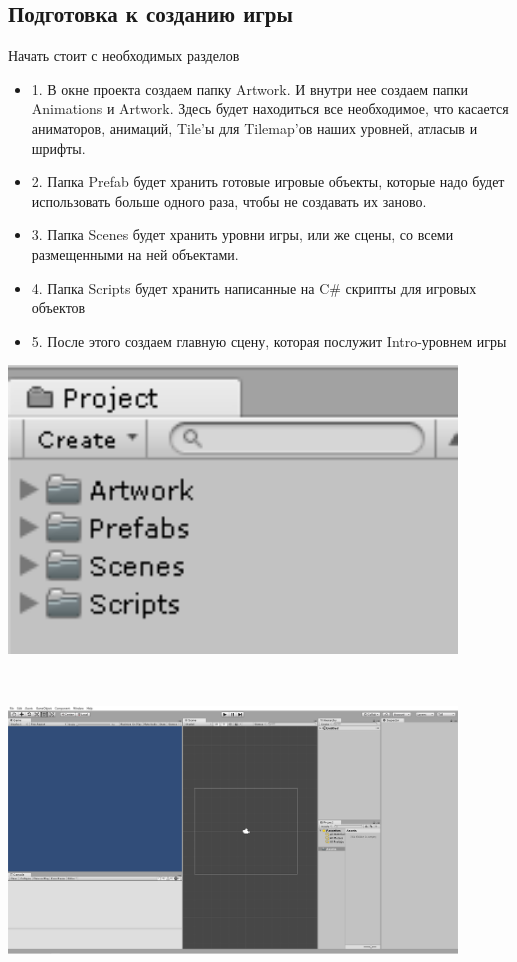 \documentclass[a4paper,12pt]{article}
\begin{document}
\newpage
\subsection{Подготовка к созданию игры}
Начать стоит с необходимых разделов \\
\begin{itemize}
    \item 1. В окне проекта создаем папку Artwork. И внутри нее создаем папки Animations и Artwork. Здесь будет находиться все необходимое, что касается аниматоров, анимаций, Tile'ы для Tilemap'ов наших уровней, атласыв и шрифты.
    \item 2. Папка Prefab будет хранить готовые игровые объекты, которые надо будет использовать больше одного раза, чтобы не создавать их заново.
    \item 3. Папка Scenes будет хранить уровни игры, или же сцены, со всеми размещенными на ней объектами.
    \item 4. Папка Scripts будет хранить написанные на C\# скрипты для игровых объектов
    \item 5. После этого создаем главную сцену, которая послужит Intro-уровнем игры
    \end{itemize}
\noindent


\centerline{\includegraphics[width = 450px]{pictures/folders.png}} \\
\vspace{2mm}
\centerline{\includegraphics[width = 450px]{pictures/layout.png}}
\end{document}

